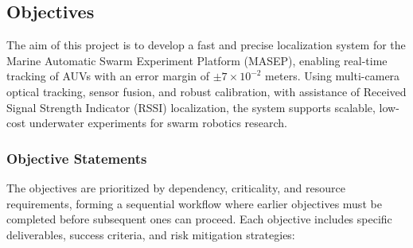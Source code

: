 \documentclass[11pt]{article}
\newcommand{\cn}[1]{\begin{CJK}{UTF8}{gbsn}#1\end{CJK}}
\newcommand{\yh}[1]{\noindent{\color{blue}\textbf{yh: }{\cn{#1}}}}
\begin{document}
    \subsection{Objectives }
        The aim of this project is to develop a fast and precise localization system for the Marine Automatic Swarm Experiment Platform (MASEP), enabling real-time tracking of AUVs with an error margin of $\pm 7\times 10^{-2}$ meters. Using multi-camera optical tracking, sensor fusion, and robust calibration, with assistance of Received Signal Strength Indicator (RSSI) localization, the system supports scalable, low-cost underwater experiments for swarm robotics research.
    \subsubsection{Objective Statements}
    The objectives are prioritized by dependency, criticality, and resource requirements, forming a sequential workflow where earlier objectives must be completed before subsequent ones can proceed. Each objective includes specific deliverables, success criteria, and risk mitigation strategies:
\end{document}
